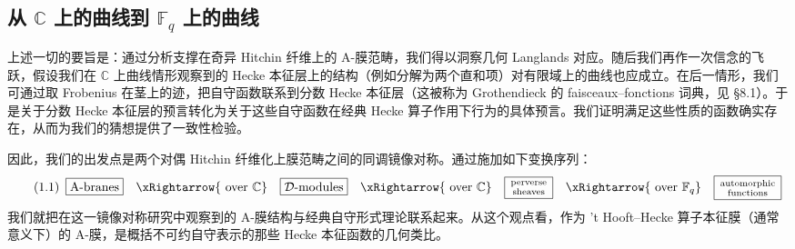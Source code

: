 \documentclass[11pt,a4paper]{article}
\newcommand{\CD}{\mathcal{D}}
\begin{document}
\subsection{从 \texorpdfstring{$\mathbb{C}$}{C} 上的曲线到 \texorpdfstring{$\mathbb{F}_q$}{Fq} 上的曲线}

上述一切的要旨是：通过分析支撑在奇异 Hitchin 纤维上的 A-膜范畴，我们得以洞察几何 Langlands 对应。随后我们再作一次信念的飞跃，假设我们在 $\mathbb{C}$ 上曲线情形观察到的 Hecke 本征层上的结构（例如分解为两个直和项）对有限域上的曲线也应成立。在后一情形，我们可通过取 Frobenius 在茎上的迹，把自守函数联系到分数 Hecke 本征层（这被称为 Grothendieck 的 faisceaux--fonctions 词典，见 §8.1）。于是关于分数 Hecke 本征层的预言转化为关于这些自守函数在经典 Hecke 算子作用下行为的具体预言。我们证明满足这些性质的函数确实存在，从而为我们的猜想提供了一致性检验。

因此，我们的出发点是两个对偶 Hitchin 纤维化上膜范畴之间的同调镜像对称。通过施加如下变换序列：
\begin{equation}\tag{1.1}
\begin{array}{ccccccc}
\boxed{\text{A-branes}} & \xRightarrow{\ \text{over }\mathbb{C}} &
\boxed{\CD\text{-modules}} & \xRightarrow{\ \text{over }\mathbb{C}} &
\boxed{\begin{smallmatrix}\text{perverse}\\ \text{sheaves}\end{smallmatrix}} & \xRightarrow{\ \text{over }\mathbb{F}_q} &
\boxed{\begin{smallmatrix}\text{automorphic}\\ \text{functions}\end{smallmatrix}}
\end{array}
\end{equation}
我们就把在这一镜像对称研究中观察到的 A-膜结构与经典自守形式理论联系起来。从这个观点看，作为 't Hooft--Hecke 算子本征膜（通常意义下）的 A-膜，是概括不可约自守表示的那些 Hecke 本征函数的几何类比。

\end{document}
